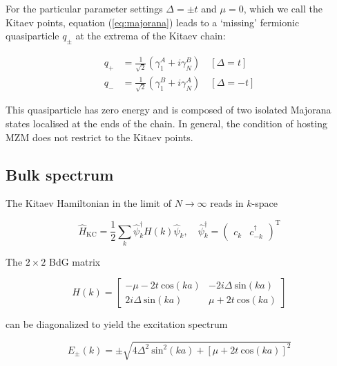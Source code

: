 For the particular parameter settings $\Delta = \pm t$ and $\mu = 0$, which we call the Kitaev points, equation (\ref{eq:majorana}) leads to a `missing' fermionic quasiparticle $q_{\pm}$ at the extrema of the Kitaev chain:

\begin{equation}
    \begin{aligned}
       q_{+} &= \frac{1}{\sqrt{2}}(\gamma^{A}_{1}+i\gamma^{B}_{N}) \quad [\Delta = t] \\
       q_{-} &= \frac{1}{\sqrt{2}}(\gamma^{B}_{1}+i\gamma^{A}_{N}) \quad [\Delta = -t]          
    \end{aligned}    
\end{equation}

This quasiparticle has zero energy and is composed of two isolated Majorana states localised at the ends of the chain. In general, the condition of hosting MZM does not restrict to the Kitaev points. \par

\subsection{Bulk spectrum}

The Kitaev Hamiltonian in the limit of $N \rightarrow \infty$ reads in $k$-space 

\begin{equation*}
    \hat{H}_{\text{KC}} = \frac{1}{2}\sum_{k}\hat{\psi}^{\dagger}_{k}H(k)\hat{\psi}_{k}, \quad \hat{\psi}^{\dagger}_{k} = \begin{pmatrix}
       c_{k} & c_{-k}^{\dagger}     
    \end{pmatrix}^{\text{T}}     
\end{equation*}

The $2 \times 2$ BdG matrix

\begin{equation}
    H(k) = 
    \begin{bmatrix}
       -\mu-2t\:\text{cos}(ka) & -2i\Delta \: \text{sin}(ka) \\
       2i\Delta \: \text{sin}(ka) & \mu+2t\: \text{cos}(ka)         
    \end{bmatrix}    
\end{equation}

can be diagonalized to yield the excitation spectrum

\begin{equation}
    E_{\pm}(k) = \pm \sqrt{4\Delta^{2}\:\text{sin}^{2}(ka)+[\mu+2t\: \text{cos}(ka)]^{2}}    
\end{equation}

